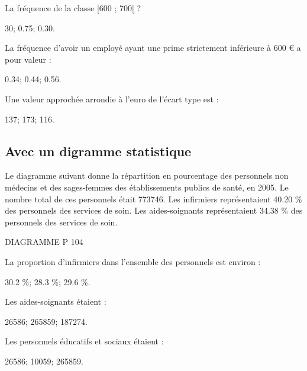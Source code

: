 \begin{questions}
	\question La fréquence de la classe [600 ; 700[ ?
	
	\begin{oneparchoices}
		\choice \num{30};
		\choice \num{0.75};
		\CorrectChoice \num{0.30}.
	\end{oneparchoices} 

	\question La fréquence d'avoir un employé ayant une prime strictement inférieure à 600 € a pour valeur :
	
	\begin{oneparchoices}
		\choice \num{0.34};
		\CorrectChoice \num{0.44};
		\choice \num{0.56}.
	\end{oneparchoices} 

	\question Une valeur approchée arrondie à l'euro de l'écart type est :
	
	\begin{oneparchoices}
		\choice \num{137};
		\choice \num{173};
		\CorrectChoice \num{116}.
	\end{oneparchoices} 
\end{questions}  

\subsection{Avec un digramme statistique}

Le diagramme suivant donne la répartition en pourcentage des personnels non médecins et des sages-femmes des établissements publics de santé, en 2005.
Le nombre total de ces personnels était \num{773746}.
Les infirmiers représentaient \num{40.20} \% des personnels des services de soin. Les aides-soignants représentaient \num{34.38} \% des personnels des services de soin.


DIAGRAMME P 104
\begin{questions}
	\question La proportion d'infirmiers dans l'ensemble des personnels est environ :
	
	\begin{oneparchoices}
		\choice \num{30.2} \%;
		\CorrectChoice \num{28.3} \%;
		\choice \num{29.6} \%.
		
	\end{oneparchoices} 

	\question Les aides-soignants étaient :
	
	\begin{oneparchoices}
		\choice \num{26586};
		\choice \num{265859};
		\CorrectChoice \num{187274}.
		
	\end{oneparchoices} 

	\question Les personnels éducatifs et sociaux étaient :
	
	\begin{oneparchoices}
		\choice \num{26586};
		\CorrectChoice \num{10059};
		\choice \num{265859}.
		
	\end{oneparchoices} 
\end{questions}